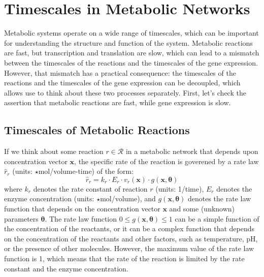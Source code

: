 \documentclass{article}[11pt]
\begin{document}
\section{Timescales in Metabolic Networks}
Metabolic systems operate on a wide range of timescales, which can be important for understanding the structure and function of the system.
Metabolic reactions are fast, but transcription and translation are slow, which can lead to a mismatch between the timescales of the reactions and the timescales of the gene expression.
However, that mismatch has a practical consequence: the timescales of the reactions and the timescales of the gene expression can be decoupled, which allows use to think about these two processes separately.
First, let's check the assertion that metabolic reactions are fast, while gene expression is slow.

\subsection{Timescales of Metabolic Reactions}
If we think about some reaction $r\in\mathcal{R}$ in a metabolic network that depends upon concentration vector $\mathbf{x}$, 
the specific rate of the reaction is goverened by a rate law $\hat{r}_{r}$ (units: $\star$mol/volume-time) of the form:
\begin{equation}\label{eqn:rate-law}
\hat{r}_{r} = k_{r}\cdot{E}_{r}\cdot{v_{r}(\mathbf{x})}\cdot{g(\mathbf{x}, \mathbf{\theta})}
\end{equation}
where $k_{r}$ denotes the rate constant of reaction $r$ (units: 1/time),
$E_{r}$ denotes the enzyme concentration (units: $\star$mol/volume), and
$g(\mathbf{x}, \mathbf{\theta})$ denotes the rate law function that depends on the concentration vector $\mathbf{x}$ and some (unknown) parameters $\mathbf{\theta}$.
The rate law function $0\leq{g(\mathbf{x}, \mathbf{\theta})}\leq{1}$ can be a simple function of the concentration of the reactants, or it can be a complex function that depends on the concentration of the reactants and other factors, 
such as temperature, pH, or the presence of other molecules. However, the maximum value of the rate law function is 1, which means that the rate of the reaction is limited by the rate constant and the enzyme concentration.
\end{document}
